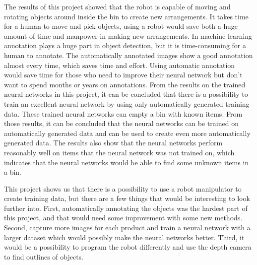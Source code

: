 The results of this project showed that the robot is capable of moving and rotating objects around inside the bin to create new arrangements. It takes time for a human to move and pick objects, using a robot would save both a huge amount of time and manpower in making new arrangements.
In machine learning annotation plays a huge part in object detection, but it is time-consuming for a human to annotate.
The automatically annotated images show a good annotation almost every time, which saves time and effort. 
Using automatic annotation would save time for those who need to improve their neural network but don't want to spend months or years on annotations.
From the results on the trained neural networks in this project, it can be concluded that there is a possibility to train an excellent neural network by using only automatically generated training data. 
These trained neural networks can empty a bin with known items.
From those results, it can be concluded that the neural networks can be trained on automatically generated data and can be used to create even more automatically generated data. 
The results also show that the neural networks perform reasonably well on items that the neural network was not trained on, which indicates that the neural networks would be able to find some unknown items in a bin.

This project shows us that there is a possibility to use a robot manipulator to create training data, but there are a few things that would be interesting to look further into. First, automatically annotating the objects was the hardest part of this project, and that would need some improvement with some new methods. Second, capture more images for each product and train a neural network with a larger dataset which would possibly make the neural networks better. Third, it would be a possibility to program the robot differently and use the depth camera to find outlines of objects.
